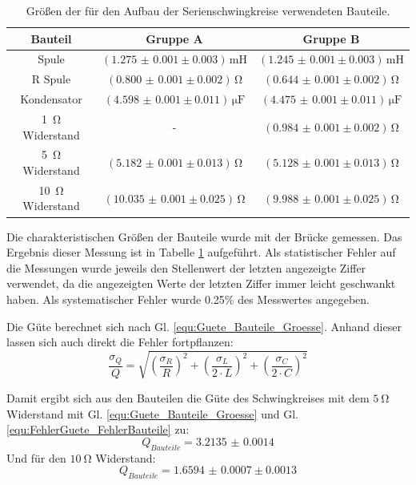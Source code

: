 \documentclass[12pt,a4paper]{article}
\begin{document}
\begin{table}
	\begin{center}
		\begin{tabular}{|c|c|c|}
			\hline 
			Bauteil & Gruppe A & Gruppe B \\ 
			\hline 
			Spule & $(\num{1.275(1)} \pm 0.003)\,\si{\milli\henry}$ & $(\num{1.245(1)} \pm 0.003)\,\si{\milli\henry}$ \\
			\hline
			R Spule & $(\num{0.800(1)} \pm 0.002)\,\si{\ohm}$ & $(\num{0.644(1)} \pm 0.002)\,\si{\ohm}$ \\
			\hline 
			Kondensator & $(\num{4.598(1)} \pm 0.011)\,\si{\micro\farad}$ & $(\num{4.475(1)} \pm 0.011)\,\si{\micro\farad}$ \\ 
			\hline 
			\SI{1}{\ohm} Widerstand & - & $(\num{0.984(1)} \pm 0.002)\,\si{\ohm}$ \\
			\hline
			\SI{5}{\ohm} Widerstand & $(\num{5.182(1)} \pm 0.013)\,\si{\ohm}$ & $(\num{5.128(1)} \pm 0.013)\,\si{\ohm}$ \\ 
			\hline 
			\SI{10}{\ohm} Widerstand & $(\num{10.035(1)} \pm 0.025)\,\si{\ohm}$ & $(\num{9.988(1)} \pm 0.025)\,\si{\ohm}$ \\ 
			\hline 
		\end{tabular} 
		\caption{Größen der für den Aufbau der Serienschwingkreise verwendeten Bauteile.}
		\label{tab:BauteileGroesse_A}
	\end{center}
\end{table}

Die charakteristischen Größen der Bauteile wurde mit der Brücke gemessen. Das Ergebnis dieser Messung ist in Tabelle \ref{tab:BauteileGroesse_A} aufgeführt.
Als statistischer Fehler auf die Messungen wurde jeweils den Stellenwert der letzten angezeigte Ziffer verwendet, da die angezeigten Werte der letzten Ziffer immer leicht geschwankt haben. Als systematischer Fehler wurde 0.25\% des Messwertes angegeben.

Die Güte berechnet sich nach Gl. \ref{equ:Guete_Bauteile_Groesse}. Anhand dieser lassen sich auch direkt die Fehler fortpflanzen:
\begin{equation}
\dfrac{\sigma _Q}{Q} = \sqrt{\left( \dfrac{\sigma _R}{R} \right)^2 + \left( \dfrac{\sigma _L}{2 \cdot L} \right)^2 + \left( \dfrac{\sigma _C}{2 \cdot C} \right)^2}
\label{equ:FehlerGuete_FehlerBauteile}
\end{equation}

Damit ergibt sich aus den Bauteilen die Güte des Schwingkreises mit dem $\SI{5}{\ohm}$ Widerstand mit Gl. \ref{equ:Guete_Bauteile_Groesse} und Gl. \ref{equ:FehlerGuete_FehlerBauteile} zu:
\begin{equation*}
Q_{Bauteile} = \num{3.2135(14)}
\end{equation*}
Und für den $\SI{10}{\ohm}$ Widerstand:
\begin{equation*}
Q_{Bauteile} = \num{1.6594(7)}\pm 0.0013
\end{equation*}
\end{document}

